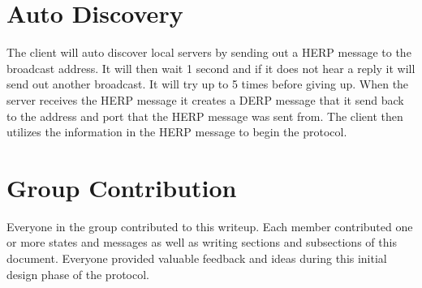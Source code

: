 \documentclass[12pt,letterpaper,titlepage]{article}
\begin{document}
\section{Auto Discovery}
The client will auto discover local servers by sending out a HERP message to the broadcast address. It will then wait 1 second and if it does not hear a reply it will send out another broadcast. It will try up to 5
times before giving up. When the server receives the HERP message it creates a DERP message that it send back to the address and port that the HERP message was sent from. The client then utilizes the information in the
HERP message to begin the protocol.

\section{Group Contribution}
Everyone in the group contributed to this writeup. Each member contributed one or more states and messages as well as writing sections and subsections of this document. Everyone provided valuable feedback and ideas during this initial design phase of the protocol.
\end{document}
